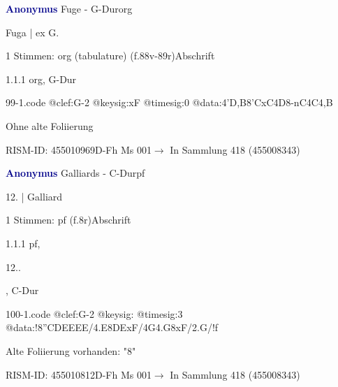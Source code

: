 \documentclass[twocolumn]{book}
\begin{document}
\par \vspace{7pt} \textcolor{darkblue}{\textbf{Anonymus  }}\hfillplus{\textbf{[99]}}\newline Fuge - G-Dur\newline org
\par \begin{itshape}[f.88v, at left:] Fuga | ex G.\end{itshape} 
\par \textcolor{darkblue}{}  1 Stimmen: org (tabulature)  (f.88v-89r)\newline Abschrift
\par 1.1.1  org, G-Dur  
\begin{filecontents*}{99-1.code}
@clef:G-2
@keysig:xF
@timesig:0
@data:4'D,B{8'CxC}4D8-nC4C4,B
\end{filecontents*}
\newline
%
\par Ohne alte Foliierung
\par RISM-ID: 455010969\newline D-Fh  Ms 001\newline $\rightarrow$ In Sammlung 418 (455008343)
      
\par \vspace{7pt} \textcolor{darkblue}{\textbf{Anonymus  }}\hfillplus{\textbf{[100]}}\newline Galliards - C-Dur\newline pf
\par \begin{itshape}[f.8r, at left:] 12. | Galliard\end{itshape} 
\par \textcolor{darkblue}{}  1 Stimmen: pf  (f.8r)\newline Abschrift
\par 1.1.1  pf, \begin{itshape}12..\end{itshape}, C-Dur  
\begin{filecontents*}{100-1.code}
@clef:G-2
@keysig:
@timesig:3
@data:!{8''CDEEEE}/4.E{8DExF}/4G4.G8xF/2.G/!f
\end{filecontents*}
\newline
%
\par Alte Foliierung vorhanden: "8"
\par RISM-ID: 455010812\newline D-Fh  Ms 001\newline $\rightarrow$ In Sammlung 418 (455008343)
      
\end{document}
